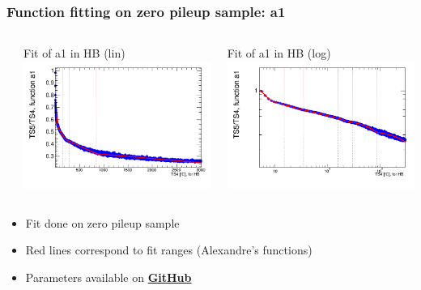 \documentclass[bigger]{beamer}
\providecommand{\alert}[1]{\textbf{#1}}
\begin{document}
\begin{frame}
\frametitle{Function fitting on zero pileup sample: a1}
\label{sec-3-2-6}
\begin{columns} %
\label{sec-3-2-6-1}
\begin{column}{0.55\textwidth}
\label{sec-3-2-6-1-1}

\centering
Fit of a1 in HB (lin)
\includegraphics[width=\textwidth]{fig/a1_ring0_lin.png}
\end{column}
\begin{column}{0.55\textwidth}
\label{sec-3-2-6-1-2}

\centering
Fit of a1 in HB (log)
\includegraphics[width=\textwidth]{fig/a1_ring0_log.png}
\end{column}
\end{columns}
\label{sec-3-2-6-2}
\begin{itemize}

\item Fit done on zero pileup sample
\label{sec-3-2-6-2-1}%

\item Red lines correspond to fit ranges (Alexandre's functions)
\label{sec-3-2-6-2-2}%

\item Parameters available on \href{https://github.com/edmundaberry/HcalReco/blob/master/analysis/src/fitResults.C}{\alert{GitHub}}
\label{sec-3-2-6-2-3}%
\end{itemize} %
\end{frame}
\end{document}
